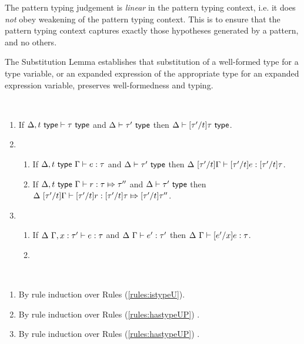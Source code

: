 \begin{grayparbox}
The {pattern typing judgement} is \emph{linear} in the pattern typing context, i.e. it does \emph{not} obey weakening of the pattern typing context. This is to ensure that the pattern typing context captures exactly those hypotheses generated by a pattern, and no others.
\end{grayparbox}

The Substitution Lemma establishes that substitution of a well-formed type for a type variable, or an expanded expression of the appropriate type for an expanded expression variable, preserves well-formedness and typing.
\begin{lemma}[Substitution]\label{lemma:substitution-UP} ~
\begin{enumerate}
\item If $\Delta, t~\mathsf{type} \vdash \tau~\mathsf{type}$ and $\Delta \vdash \tau'~\mathsf{type}$ then $\Delta \vdash [\tau'/t]\tau~\mathsf{type}$.
\item \begin{enumerate}
  \item If $\Delta, t~\mathsf{type}~\Gamma \vdash e : \tau$ and $\Delta \vdash \tau'~\mathsf{type}$ then $\Delta~[\tau'/t]\Gamma \vdash [\tau'/t]e : [\tau'/t]\tau$.
  \item \begin{grayparbox} 
  {If} $\Delta, t~\mathsf{type}~\Gamma \vdash r : \tau \Mapsto \tau''$ and $\Delta \vdash \tau'~\mathsf{type}$ then $\Delta~[\tau'/t]\Gamma \vdash [\tau'/t]r : [\tau'/t]\tau \Mapsto [\tau'/t]\tau''$.
  \end{grayparbox}
  \end{enumerate}
\item \begin{enumerate}
  \item If $\Delta~\Gamma, x : \tau' \vdash e : \tau$ and $\Delta~\Gamma \vdash e' : \tau'$ then $\Delta~\Gamma \vdash [e'/x]e : \tau$.
  \item {}
  \end{enumerate}
\end{enumerate}\end{lemma}
\begin{proof-sketch} ~
\begin{enumerate}
\item By rule induction over Rules (\ref{rules:istypeU}).
\item By  rule induction over Rules (\ref{rules:hastypeUP}) .
\item By  rule induction over Rules (\ref{rules:hastypeUP}) .
\end{enumerate}
\end{proof-sketch}

